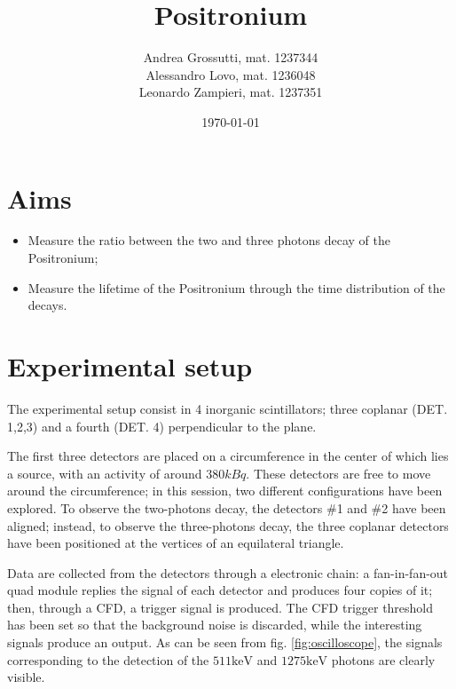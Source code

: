 \documentclass[11pt,a4 paper]{article}
\title{Positronium}
\author{Andrea Grossutti, mat. 1237344\\Alessandro Lovo, mat. 1236048\\Leonardo Zampieri, mat. 1237351}
\date{\today}
\begin{document}
\maketitle

\section{Aims}
\begin{itemize}
    \item Measure the ratio between the two and three photons decay of the Positronium;
    \item Measure the lifetime of the Positronium through the time distribution of the decays.
\end{itemize}



\section{Experimental setup}
The experimental setup consist in 4 inorganic scintillators; three coplanar (DET. 1,2,3) and a fourth (DET. 4) perpendicular to the plane.

The first three detectors are placed on a circumference in the center of which lies a  source, with an activity of around $380\si{kBq}$. These detectors are free to move around the circumference; in this session, two different configurations have been explored. To observe the two-photons decay, the detectors \#1 and \#2 have been aligned; instead, to observe the three-photons decay, the three coplanar detectors have been positioned at the vertices of an equilateral triangle.

Data are collected from the detectors through a electronic chain: a fan-in-fan-out quad module replies the signal of each detector and produces four copies of it; then, through a CFD, a trigger signal is produced.  The CFD trigger threshold has been set so that the background noise is discarded, while the interesting signals produce an output. As can be seen from fig. \ref{fig:oscilloscope}, the signals corresponding to the detection of the $511\si{\kilo\electronvolt}$ and $1275\si{\kilo\electronvolt}$ photons are clearly visible.
\end{document}
